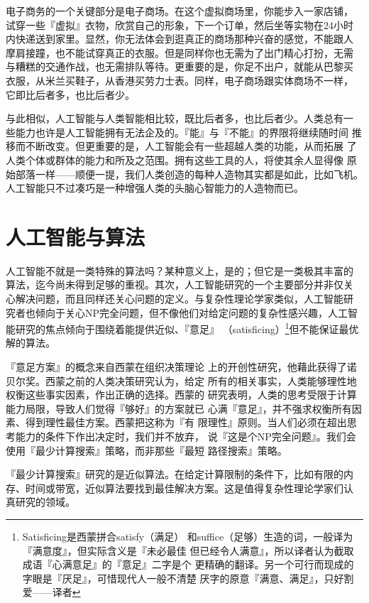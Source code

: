 \documentclass[12pt,a4paper]{article}
\begin{document}
电子商务的一个关键部分是电子商场。在这个虚拟商场里，你能步入一家店铺，
试穿一些『虚拟』衣物，欣赏自己的形象，下一个订单，然后坐等实物在24小时
内快递送到家里。显然，你无法体会到逛真正的商场那种兴奋的感觉，不能跟人
摩肩接蹱，也不能试穿真正的衣服。但是同样你也无需为了出门精心打扮，无需
与糟糕的交通作战，也无需排队等待。更重要的是，你足不出户，就能从巴黎买
衣服，从米兰买鞋子，从香港买劳力士表。同样，电子商场跟实体商场不一样，
它即比后者多，也比后者少。

与此相似，人工智能与人类智能相比较，既比后者多，也比后者少。人类总有一
些能力也许是人工智能拥有无法企及的。『能』与『不能』的界限将继续随时间
推移而不断改变。但更重要的是，人工智能会有一些超越人类的功能，从而拓展
了人类个体或群体的能力和所及之范围。拥有这些工具的人，将使其余人显得像
原始部落一样——顺便一提，我们人类创造的每种人造物其实都是如此，比如飞机。
人工智能只不过凑巧是一种增强人类的头脑心智能力的人造物而已。

\section{人工智能与算法}

人工智能不就是一类特殊的算法吗？某种意义上，是的；但它是一类极其丰富的
算法，迄今尚未得到足够的重视。其次，人工智能研究的一个主要部分并非仅关
心解决问题，而且同样还关心问题的定义。与复杂性理论学家类似，人工智能研
究者也倾向于关心NP完全问题，但不像他们对给定问题的复杂性感兴趣，人工智
能研究的焦点倾向于围绕着能提供近似、『意足』
（satisficing）\footnote{Satisficing是西蒙拼合satisfy（满足）
  和suffice（足够）生造的词，一般译为『满意度』，但实际含义是『未必最佳
  但已经令人满意』，所以译者认为截取成语『心满意足』的『意足』二字是个
  更精确的翻译。另一个可行而现成的字眼是『厌足』，可惜现代人一般不清楚
  厌字的原意『满意、满足』，只好割爱——译者}但不能保证最优解的算法。

『意足方案』的概念来自西蒙在组织决策理论
上的开创性研究，他藉此获得了诺贝尔奖。西蒙之前的人类决策研究认为，给定
所有的相关事实，人类能够理性地权衡这些事实因素，作出正确的选择。西蒙的
研究表明，人类的思考受限于计算能力局限，导致人们觉得『够好』的方案就已
心满『意足』，并不强求权衡所有因素、得到理性最佳方案。西蒙把这称为『有
限理性』原则。当人们必须在超出思考能力的条件下作出决定时，我们并不放弃，
说『这是个NP完全问题』。我们会使用『最少计算搜索』策略，而非那些『最短
路径搜索』策略。

『最少计算搜索』研究的是近似算法。在给定计算限制的条件下，比如有限的内
存、时间或带宽，近似算法要找到最佳解决方案。这是值得复杂性理论学家们认
真研究的领域。
\end{document}
